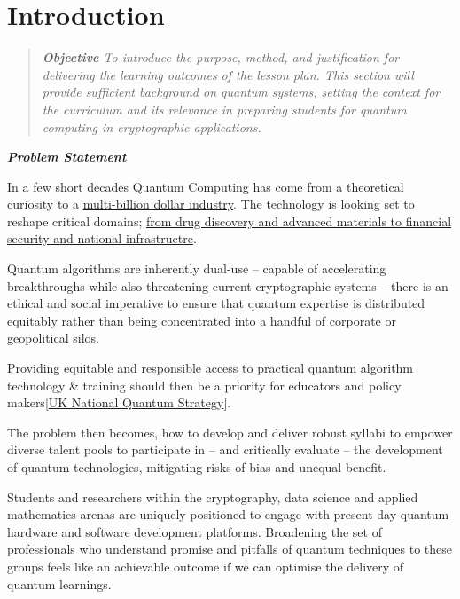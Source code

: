 \section{Introduction}


\begin{quote}\itshape
	\textbf{\emph{Objective}}
	To introduce the purpose, method, and justification for delivering the learning outcomes of the lesson plan. 
	This section will provide sufficient background on quantum systems, setting the context for the curriculum 
	and its relevance in preparing students for quantum computing in cryptographic applications.
\end{quote}\ignorespacesafterend


\textbf{\emph{Problem Statement}}

In a few short decades Quantum Computing has come from a theoretical curiosity \cite{Deutsch:1985} \cite{Feynman:1986} 
to a \href{https://quantumconsortium.org/stateofthequantumindustry2025}{multi-billion dollar industry}.
The technology is looking set to reshape critical domains; \href{https://blog.google/technology/research/google-quantum-computer-real-world-applications/}
{from drug discovery and advanced materials to financial security and national infrastructre}.

Quantum algorithms are inherently dual-use 
-- capable of accelerating breakthroughs while also threatening current cryptographic systems -- 
there is an ethical and social imperative to ensure that quantum expertise is distributed equitably
rather than being concentrated into a handful of corporate or geopolitical silos.

Providing equitable and responsible access to practical quantum algorithm technology \& training should then 
be a priority for educators and policy makers[\href{https://www.gov.uk/government/publications/national-quantum-strategy?lang=en-gb}{UK National Quantum Strategy}]. 

The problem then becomes, how to develop and deliver robust syllabi to empower diverse talent pools to 
participate in -- and critically evaluate -- the development of quantum technologies, 
mitigating risks of bias and unequal benefit.

Students and researchers within the cryptography, data science and applied mathematics arenas 
are uniquely positioned to engage with present-day quantum hardware and software development platforms.
Broadening the set of professionals who understand promise and pitfalls of quantum techniques to these groups 
feels like an achievable outcome if we can optimise the delivery of quantum learnings.

